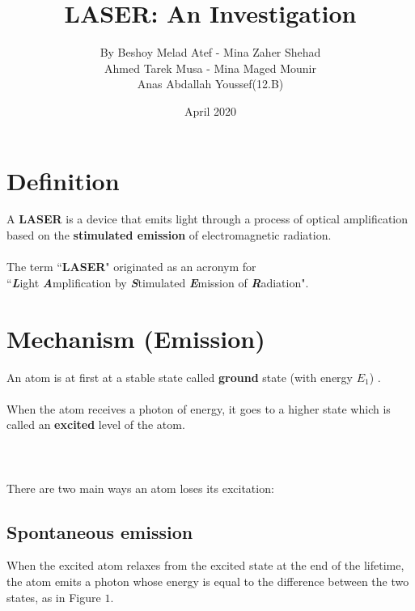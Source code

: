 \documentclass[a4paper,12pt]{article}
\begin{document}
\title{\textbf{LASER: An Investigation}}
\author{By Beshoy Melad Atef - Mina Zaher Shehad \\ Ahmed Tarek Musa - Mina Maged Mounir  \\ Anas Abdallah Youssef(12.B)}
\date{April 2020}
\maketitle
\section{Definition}
A \textbf{LASER} is a device that emits light through a process of optical amplification based on the \textbf{stimulated emission} of electromagnetic radiation.\\ \\
The term “\textbf{LASER}" originated as an acronym for \\ “\textit{\textbf{L}}ight \textit{\textbf{A}}mplification by \textit{\textbf{S}}timulated \textit{\textbf{E}}mission of \textit{\textbf{R}}adiation".
\section{Mechanism (Emission)}
An atom is at first at a stable state called \textbf{ground} state (with energy $E_1$) . \\ \\
When the atom receives a photon of energy, it goes to a higher state which is called an \textbf{excited} level of the atom. \\ \\
 \\ \\
There are two main ways an atom loses its excitation:  
\subsection{Spontaneous emission}
When the excited atom relaxes from the excited state at the end of the lifetime, the atom emits a photon whose energy is equal to the difference between the two states, as in Figure $1$.
\end{document}
